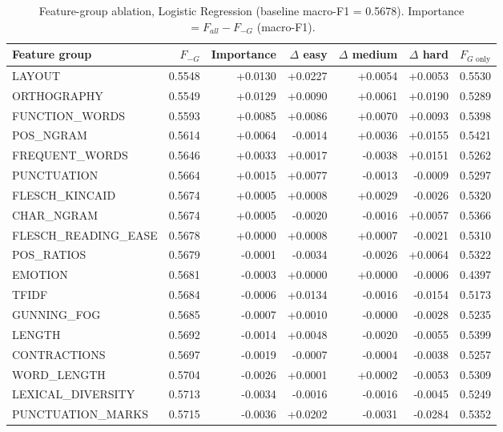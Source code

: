 \begin{table}[ht]
\centering
\small
\caption{Feature-group ablation, Logistic Regression (baseline macro-F1 = 0.5678). Importance $= F_{all} - F_{-G}$ (macro-F1).}
\label{tab:ablation-features-logistic}
\begin{tabular}{lrrrrrr}
\toprule
Feature group & $F_{-G}$ & Importance & $\Delta$ easy & $\Delta$ medium & $\Delta$ hard & $F_{G\text{ only}}$ \\
\midrule
LAYOUT & 0.5548 & +0.0130 & +0.0227 & +0.0054 & +0.0053 & 0.5530 \\
ORTHOGRAPHY & 0.5549 & +0.0129 & +0.0090 & +0.0061 & +0.0190 & 0.5289 \\
FUNCTION\_WORDS & 0.5593 & +0.0085 & +0.0086 & +0.0070 & +0.0093 & 0.5398 \\
POS\_NGRAM & 0.5614 & +0.0064 & -0.0014 & +0.0036 & +0.0155 & 0.5421 \\
FREQUENT\_WORDS & 0.5646 & +0.0033 & +0.0017 & -0.0038 & +0.0151 & 0.5262 \\
PUNCTUATION & 0.5664 & +0.0015 & +0.0077 & -0.0013 & -0.0009 & 0.5297 \\
FLESCH\_KINCAID & 0.5674 & +0.0005 & +0.0008 & +0.0029 & -0.0026 & 0.5320 \\
CHAR\_NGRAM & 0.5674 & +0.0005 & -0.0020 & -0.0016 & +0.0057 & 0.5366 \\
FLESCH\_READING\_EASE & 0.5678 & +0.0000 & +0.0008 & +0.0007 & -0.0021 & 0.5310 \\
POS\_RATIOS & 0.5679 & -0.0001 & -0.0034 & -0.0026 & +0.0064 & 0.5322 \\
EMOTION & 0.5681 & -0.0003 & +0.0000 & +0.0000 & -0.0006 & 0.4397 \\
TFIDF & 0.5684 & -0.0006 & +0.0134 & -0.0016 & -0.0154 & 0.5173 \\
GUNNING\_FOG & 0.5685 & -0.0007 & +0.0010 & -0.0000 & -0.0028 & 0.5235 \\
LENGTH & 0.5692 & -0.0014 & +0.0048 & -0.0020 & -0.0055 & 0.5399 \\
CONTRACTIONS & 0.5697 & -0.0019 & -0.0007 & -0.0004 & -0.0038 & 0.5257 \\
WORD\_LENGTH & 0.5704 & -0.0026 & +0.0001 & +0.0002 & -0.0053 & 0.5309 \\
LEXICAL\_DIVERSITY & 0.5713 & -0.0034 & -0.0016 & -0.0016 & -0.0045 & 0.5249 \\
PUNCTUATION\_MARKS & 0.5715 & -0.0036 & +0.0202 & -0.0031 & -0.0284 & 0.5352 \\
\bottomrule
\end{tabular}
\end{table}

